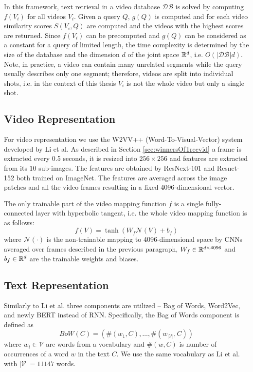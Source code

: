 In this framework, text retrieval in a video database $\mathcal{DB}$ is solved by computing $f(V_i)$ for all videos $V_i$. Given a query $Q$, $g(Q)$ is computed and for each video similarity scores $S(V_i, Q)$ are computed and the videos with the highest scores are returned. Since $f(V_i)$ can be precomputed and $g(Q)$ can be considered as a constant for a query of limited length, the time complexity is determined by the size of the database and the dimension $d$ of the joint space $\mathbb{R}^d$, i.e. $O(|\mathcal{DB}|d)$. Note, in practice, a video can contain many unrelated segments while the query usually describes only one segment; therefore, videos are split into individual shots, i.e. in the context of this thesis $V_i$ is not the whole video but only a single shot.


\subsection{Video Representation}
For video representation we use the W2VV++ (Word-To-Visual-Vector) system~\cite{XirongW2VVpp} developed by Li et al. As described in Section \ref{sec:winnersOfTrecvid} a frame is extracted every 0.5 seconds, it is resized into $256\times 256$ and features are extracted from its 10 sub-images. The features are obtained by ResNext-101 \cite{ImageNetShuffle} and Resnet-152 \cite{mxnet} both trained on ImageNet. The features are averaged across the image patches and all the video frames resulting in a fixed 4096-dimensional vector.

The only trainable part of the video mapping function $f$ is a single fully-connected layer with hyperbolic tangent, i.e. the whole video mapping function is as follows:
\begin{equation}
    f(V)=\tanh\left(W_f\mathcal{N}(V)+b_f\right)
\end{equation}
where $\mathcal{N}(\cdot)$ is the non-trainable mapping to 4096-dimensional space by CNNs averaged over frames described in the previous paragraph, $W_f\in\mathbb{R}^{d\times 4096}$ and $b_f\in \mathbb{R}^d$ are the trainable weights and biases.

\subsection{Text Representation}
Similarly to Li et al. three components are utilized -- Bag of Words, Word2Vec, and newly BERT instead of RNN. Specifically, the Bag of Words component is defined as
\begin{equation}
    BoW(C)=\left(\#(w_1, C),\ldots,\#(w_{|\mathcal{V}|}, C)\right)
\end{equation}
where $w_i\in\mathcal{V}$ are words from a vocabulary and $\#(w,C)$ is number of occurrences of a word $w$ in the text $C$. We use the same vocabulary as Li et al. with $|\mathcal{V}|=11147$ words.


